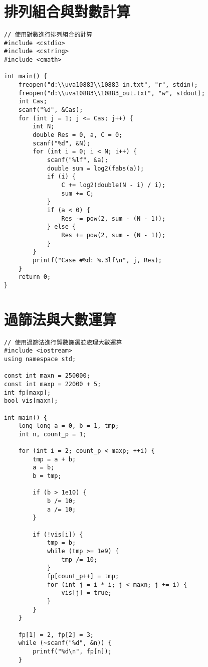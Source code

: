 \documentclass{article}
\begin{document}
\begin{multicols}{2}
\section{排列組合與對數計算}

\begin{lstlisting}
// 使用對數進行排列組合的計算
#include <cstdio>
#include <cstring>
#include <cmath>

int main() {
    freopen("d:\\uva10883\\10883_in.txt", "r", stdin);
    freopen("d:\\uva10883\\10883_out.txt", "w", stdout);
    int Cas;
    scanf("%d", &Cas);
    for (int j = 1; j <= Cas; j++) {
        int N;
        double Res = 0, a, C = 0;
        scanf("%d", &N);
        for (int i = 0; i < N; i++) {
            scanf("%lf", &a);
            double sum = log2(fabs(a));
            if (i) {
                C += log2(double(N - i) / i);
                sum += C;
            }
            if (a < 0) {
                Res -= pow(2, sum - (N - 1));
            } else {
                Res += pow(2, sum - (N - 1));
            }
        }
        printf("Case #%d: %.3lf\n", j, Res);
    }
    return 0;
}
\end{lstlisting}

\section{過篩法與大數運算}

\begin{lstlisting}
// 使用過篩法進行質數篩選並處理大數運算
#include <iostream>
using namespace std;

const int maxn = 250000;
const int maxp = 22000 + 5;
int fp[maxp];
bool vis[maxn];

int main() {
    long long a = 0, b = 1, tmp;
    int n, count_p = 1;

    for (int i = 2; count_p < maxp; ++i) {
        tmp = a + b;
        a = b;
        b = tmp;

        if (b > 1e10) {
            b /= 10;
            a /= 10;
        }

        if (!vis[i]) {
            tmp = b;
            while (tmp >= 1e9) {
                tmp /= 10;
            }
            fp[count_p++] = tmp;
            for (int j = i * i; j < maxn; j += i) {
                vis[j] = true;
            }
        }
    }

    fp[1] = 2, fp[2] = 3;
    while (~scanf("%d", &n)) {
        printf("%d\n", fp[n]);
    }


\end{lstlisting}
\end{multicols}
\end{document}

